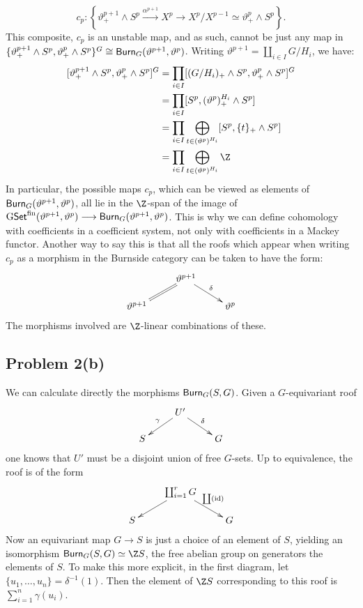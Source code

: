 \documentclass[11pt]{article}
\begin{document}
\[c_p:\left\{\vartheta_+^{p+1}\wedge S^p\overset{\alpha^{p+1}}{\to} X^p\to X^p/X^{p-1}\simeq\vartheta_+^{p}\wedge S^p\right\}.\]
This composite, $c_p$ is an unstable map, and as such, cannot be just any map in $\{\vartheta_+^{p+1}\wedge S^p,\vartheta_+^{p}\wedge S^p\}^G\cong\operatorname{{\mathsf{Burn}}}_G(\vartheta^{p+1},\vartheta^p)$. Writing $\vartheta^{p+1}=\coprod_{i\in I}G/H_i$, we have:
\begin{alignat*}{2}
[\vartheta^{p+1}_+\wedge S^p,\vartheta^p_+\wedge S^p]^G&=\prod_{i\in I}[(G/H_i)_+\wedge S^p,\vartheta^p_+\wedge S^p]^G\\
&=\prod_{i\in I}[S^p,(\vartheta^p)^{H_i}_+\wedge S^p]\\
&=\prod_{i\in I}\bigoplus_{t\in(\vartheta^p)^{H_i}}[S^p,\{t\}_+\wedge S^p]\\
&=\prod_{i\in I}\bigoplus_{t\in(\vartheta^p)^{H_i}}\Z
\end{alignat*}
In particular, the possible maps $c_p$, which can be viewed as elements of $\operatorname{{\mathsf{Burn}}}_G(\vartheta^{p+1},\vartheta^p)$, all lie in the $\Z$-span of the image of $\operatorname{{G\mathsf{Set}^\textup{fin}}}(\vartheta^{p+1},\vartheta^p)\longrightarrow\operatorname{{\mathsf{Burn}}}_G(\vartheta^{p+1},\vartheta^p)$. This is why we can define cohomology with coefficients in a coefficient system, not only with coefficients in a Mackey functor. Another way to say this is that all the roofs which appear when writing $c_p$ as a morphism in the Burnside category can be taken to have the form:
\[\xymatrix@R=5mm{&\vartheta^{p+1}\ar@{=}[dl]\ar[dr]^\delta\\
\vartheta^{p+1}&&\vartheta^p}\]
The morphisms involved are $\Z$-linear combinations of these.
\subsection*{Problem 2(b)}
We can calculate directly the morphisms $\operatorname{{\mathsf{Burn}}}_G(S,G)$. Given a $G$-equivariant roof
\[\xymatrix@R=5mm{&U'\ar[dl]_\gamma\ar[dr]^\delta\\S&&G}\]
one knows that $U'$ must be a disjoint union of free $G$-sets. Up to equivalence, the roof is of the form
\[\xymatrix@R=5mm{&\coprod_{i=1}^rG\ar[dl]\ar[dr]^{\coprod(\id)}\\S&&G}\]
Now an equivariant map $G\to S$ is just a choice of an element of $S$, yielding an isomorphism $\Burnside_G(S,G)\simeq\Z S$, the free abelian group on generators the elements of $S$. To make this more explicit, in the first diagram, let $\{u_1,\ldots, u_n\}=\delta^{-1}(1)$. Then the element of $\Z S$ corresponding to this roof is $\sum_{i=1}^n\gamma(u_i)$.
\end{document}

